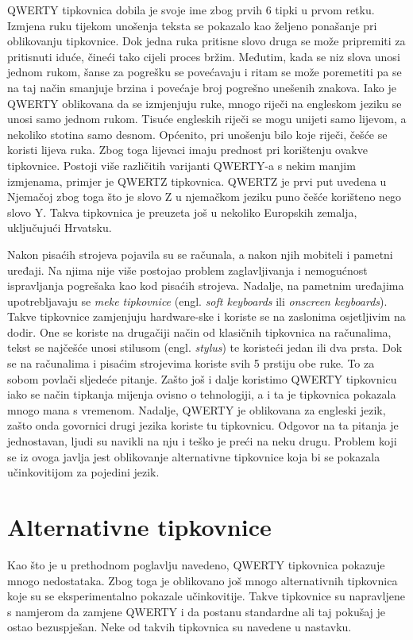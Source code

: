 \documentclass[times, utf8, zavrsni]{fer}
\begin{document}
QWERTY tipkovnica dobila je svoje ime zbog prvih 6 tipki u prvom retku. Izmjena ruku tijekom unošenja teksta se pokazalo kao željeno ponašanje pri oblikovanju tipkovnice. Dok jedna ruka pritisne slovo druga se može pripremiti za pritisnuti iduće, čineći tako cijeli proces bržim. Međutim, kada se niz slova unosi jednom rukom, šanse za pogrešku se povećavaju i ritam se može poremetiti pa se na taj način smanjuje brzina i povećaje broj pogrešno unešenih znakova. Iako je QWERTY oblikovana da se izmjenjuju ruke, mnogo riječi na engleskom jeziku se unosi samo jednom rukom. Tisuće engleskih riječi se mogu unijeti samo lijevom, a nekoliko stotina samo desnom. Općenito, pri unošenju bilo koje riječi, češće se koristi lijeva ruka. Zbog toga lijevaci imaju prednost pri korištenju ovakve tipkovnice. Postoji više različitih varijanti QWERTY-a s nekim manjim izmjenama, primjer je QWERTZ tipkovnica. QWERTZ je prvi put uvedena u Njemačoj zbog toga što je slovo Z u njemačkom jeziku puno češće korišteno nego slovo Y. Takva tipkovnica je preuzeta još u nekoliko Europskih zemalja, uključujući Hrvatsku.

Nakon pisaćih strojeva pojavila su se računala, a nakon njih mobiteli i pametni uređaji. Na njima nije više postojao problem zaglavljivanja i nemogućnost ispravljanja pogrešaka kao kod pisaćih strojeva. Nadalje, na pametnim uređajima upotrebljavaju se \emph{meke tipkovnice} (engl. \emph{soft keyboards} ili \emph{onscreen keyboards}). Takve tipkovnice zamjenjuju hardware-ske i koriste se na zaslonima osjetljivim na dodir. One se koriste na drugačiji način od klasičnih tipkovnica na računalima, tekst se najčešće unosi stilusom (engl. \emph{stylus}) te koristeći jedan ili dva prsta. Dok se na računalima i pisaćim strojevima koriste svih 5 prstiju obe ruke. To za sobom povlači sljedeće pitanje. Zašto još i dalje koristimo QWERTY tipkovnicu iako se način tipkanja mijenja ovisno o tehnologiji, a i ta je tipkovnica pokazala mnogo mana s vremenom. Nadalje, QWERTY je oblikovana za engleski jezik, zašto onda govornici drugi jezika koriste tu tipkovnicu. Odgovor na ta pitanja je jednostavan, ljudi su navikli na nju i teško je preći na neku drugu. Problem koji se iz ovoga javlja jest oblikovanje alternativne tipkovnice koja bi se pokazala učinkovitijom za pojedini jezik.

\chapter{Alternativne tipkovnice}

Kao što je u prethodnom poglavlju navedeno, QWERTY tipkovnica pokazuje mnogo nedostataka. Zbog toga je oblikovano još mnogo alternativnih tipkovnica koje su se eksperimentalno pokazale učinkovitije. Takve tipkovnice su napravljene s namjerom da zamjene QWERTY i da postanu standardne ali taj pokušaj je ostao bezuspješan. Neke od takvih tipkovnica su navedene u nastavku.
\end{document}
